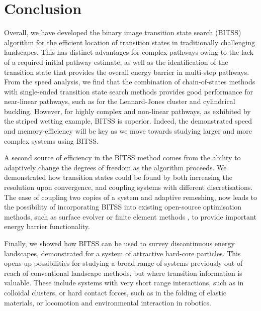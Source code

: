 \documentclass[aip,jcp,reprint,twocolumn]{revtex4-1}
\begin{document}
\section{Conclusion}
Overall, we have developed the binary image transition state search (BITSS) algorithm for the efficient location of transition states in traditionally challenging landscapes.
This has distinct advantages for complex pathways owing to the lack of a required initial pathway estimate, as well as the identification of the transition state that provides the overall energy barrier in multi-step pathways.
From the speed analysis, we find that the combination of chain-of-states methods with single-ended transition state search methods provides good performance for near-linear pathways, such as for the Lennard-Jones cluster and cylindrical buckling.
However, for highly complex and non-linear pathways, as exhibited by the striped wetting example, BITSS is superior.
Indeed, the demonstrated speed and memory-efficiency will be key as we move towards studying larger and more complex systems using BITSS.

A second source of efficiency in the BITSS method comes from the ability to adaptively change the degrees of freedom as the algorithm proceeds.
We demonstrated how transition states could be found by both increasing the resolution upon convergence, and coupling systems with different discretisations.
The ease of coupling two copies of a system and adaptive remeshing, now leads to the possibility of incorporating BITSS into existing open-source optimisation methods, such as surface evolver \cite{Brakke1992} or finite element methods \cite{Kolev2021}, to provide important energy barrier functionality.

Finally, we showed how BITSS can be used to survey discontinuous energy landscapes, demonstrated for a system of attractive hard-core particles.
This opens up possibilities for studying a broad range of systems previously out of reach of conventional landscape methods, but where transition information is valuable.
These include systems with very short range interactions, such as in colloidal clusters, or hard contact forces, such as in the folding of elastic materials, or locomotion and environmental interaction in robotics.
\end{document}
